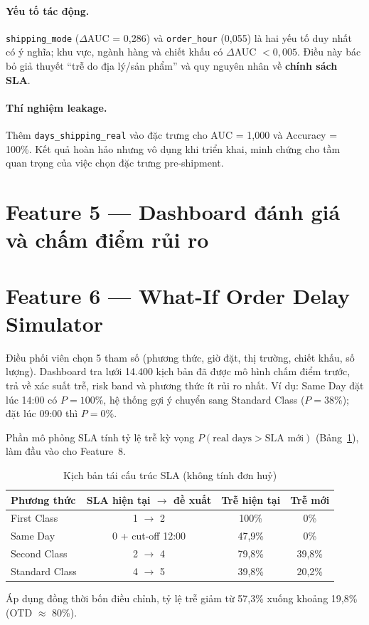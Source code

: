 \paragraph{Yếu tố tác động.} \texttt{shipping\_mode} ($\Delta$AUC = 0,286) và \texttt{order\_hour}
(0,055) là hai yếu tố duy nhất có ý nghĩa; khu vực, ngành hàng và chiết khấu có $\Delta$AUC $<0{,}005$.
Điều này bác bỏ giả thuyết ``trễ do địa lý/sản phẩm'' và quy nguyên nhân về \textbf{chính sách SLA}.

\paragraph{Thí nghiệm leakage.} Thêm \texttt{days\_shipping\_real} vào đặc trưng cho AUC = 1,000 và
Accuracy = 100\%. Kết quả hoàn hảo nhưng vô dụng khi triển khai, minh chứng cho tầm quan trọng của
việc chọn đặc trưng pre-shipment.

\section{Feature 5 --- Dashboard đánh giá và chấm điểm rủi ro}

\section{Feature 6 --- What-If Order Delay Simulator}
Điều phối viên chọn 5 tham số (phương thức, giờ đặt, thị trường, chiết khấu, số lượng). Dashboard
tra lưới 14.400 kịch bản đã được mô hình chấm điểm trước, trả về xác suất trễ, risk band và
phương thức ít rủi ro nhất. Ví dụ: Same Day đặt lúc 14:00 có $P=100\%$, hệ thống gợi ý chuyển sang
Standard Class ($P=38\%$); đặt lúc 09:00 thì $P=0\%$.

Phần mô phỏng SLA tính tỷ lệ trễ kỳ vọng $P(\text{real days} > \text{SLA mới})$
(Bảng~\ref{tab:sla}), làm đầu vào cho Feature~8.

\begin{table}[H]
\centering
\caption{Kịch bản tái cấu trúc SLA (không tính đơn huỷ)}
\label{tab:sla}
\begin{tabular}{lccc}
\toprule
\textbf{Phương thức} & \textbf{SLA hiện tại $\rightarrow$ đề xuất} & \textbf{Trễ hiện tại} & \textbf{Trễ mới} \\ \midrule
First Class    & 1 $\rightarrow$ 2 & 100\%  & 0\% \\
Same Day       & 0 + cut-off 12:00 & 47,9\% & 0\% \\
Second Class   & 2 $\rightarrow$ 4 & 79,8\% & 39,8\% \\
Standard Class & 4 $\rightarrow$ 5 & 39,8\% & 20,2\% \\
\bottomrule
\end{tabular}
\end{table}
Áp dụng đồng thời bốn điều chỉnh, tỷ lệ trễ giảm từ 57,3\% xuống khoảng 19,8\% (OTD $\approx$ 80\%).


